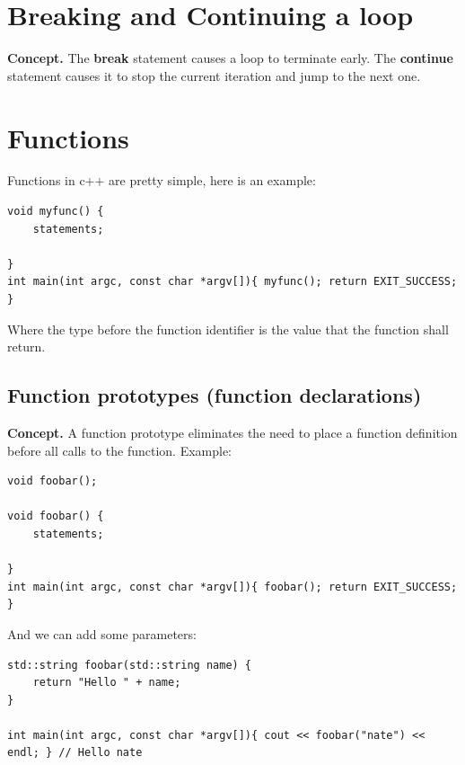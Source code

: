 \documentclass{report}
\begin{document}
    \pagebreak \bigbreak \noindent 
    \section{\LARGE Breaking and Continuing a loop}
    \bigbreak \noindent 
    \textbf{Concept.} The \textbf{break} statement causes a loop to terminate early. The \textbf{continue} statement causes it to stop the current iteration and jump to the next one.

    \pagebreak \bigbreak \noindent 
    \section{\LARGE Functions}
    \bigbreak \noindent 
    Functions in c++ are pretty simple, here is an example:
    \bigbreak \noindent 
    \sepline
    \begin{verbatim}
void myfunc() {
    statements;

}
int main(int argc, const char *argv[]){ myfunc(); return EXIT_SUCCESS; }
    \end{verbatim}
    \sepline
    \bigbreak \noindent 
    Where the type before the function identifier is the value that the function shall return.
    \bigbreak \noindent 
    \subsection{Function prototypes (function declarations)}
    \bigbreak \noindent 
    \textbf{Concept.} A function prototype eliminates the need to place a function definition before all calls to the function.
    \bigbreak \noindent 
    Example:
    \bigbreak \noindent 
    \sepline
    \begin{verbatim}
void foobar();

void foobar() {
    statements;

}
int main(int argc, const char *argv[]){ foobar(); return EXIT_SUCCESS; }
    \end{verbatim}
    \sepline
    \bigbreak \noindent 
    \bigbreak \noindent 
    And we can add some parameters:
    \bigbreak \noindent 
    \sepline
    \begin{verbatim}
std::string foobar(std::string name) {
    return "Hello " + name;
}  

int main(int argc, const char *argv[]){ cout << foobar("nate") << endl; } // Hello nate 
    \end{verbatim}
    \sepline
\end{document}
